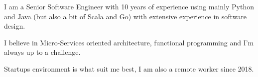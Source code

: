 

\begin{cvparagraph}

I am a Senior Software Engineer with 10 years of experience using mainly Python and Java (but also a bit of Scala and Go) with extensive experience in software design.

I believe in Micro-Services oriented architecture, functional programming and I'm always up to a challenge.

Startups environment is what suit me best, I am also a remote worker since 2018.

\end{cvparagraph}
